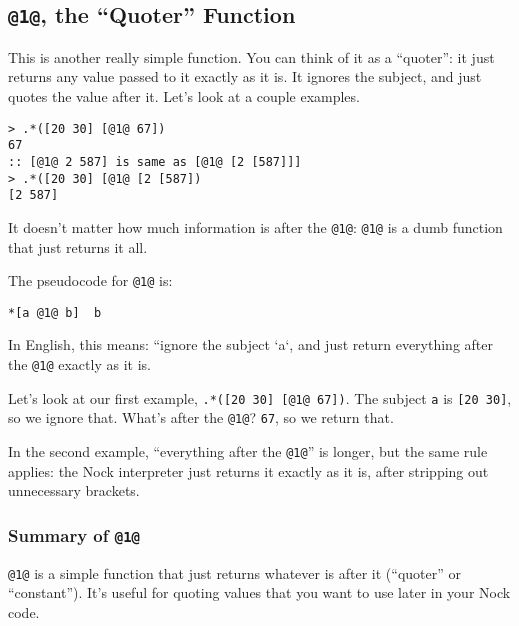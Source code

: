 \documentclass[twoside]{article}
\begin{document}
\subsection{\lstinline[style=inlinecode]{@1@}, the “Quoter” Function}
\label{sxn:nock1}

This is another really simple function. You can think of it as a “quoter”: it just returns any value passed to it exactly as it is. It ignores the subject, and just quotes the value after it. Let's look at a couple examples.

\begin{lstlisting}[style=listingcode]
> .*([20 30] [@1@ 67])
67
:: [@1@ 2 587] is same as [@1@ [2 [587]]]
> .*([20 30] [@1@ [2 [587])
[2 587]
\end{lstlisting}

It doesn't matter how much information is after the \lstinline[style=inlinecode]{@1@}: \lstinline[style=inlinecode]{@1@} is a dumb function that just returns it all.

The pseudocode for \lstinline[style=inlinecode]{@1@} is:

\begin{lstlisting}[style=listingcode]
*[a @1@ b]  b
\end{lstlisting}

In English, this means: ``ignore the subject `a`, and just return everything after the \lstinline[style=inlinecode]{@1@} exactly as it is.

Let's look at our first example, \lstinline[style=inlinecode]{.*([20 30] [@1@ 67])}. The subject \lstinline[style=inlinecode]{a} is \lstinline[style=inlinecode]{[20 30]}, so we ignore that. What's after the \lstinline[style=inlinecode]{@1@}? \lstinline[style=inlinecode]{67}, so we return that.

In the second example, “everything after the \lstinline[style=inlinecode]{@1@}” is longer, but the same rule applies: the Nock interpreter just returns it exactly as it is, after stripping out unnecessary brackets.

\subsubsection{Summary of \lstinline[style=inlinecode]{@1@}}

\lstinline[style=inlinecode]{@1@} is a simple function that just returns whatever is after it (“quoter” or “constant”). It's useful for quoting values that you want to use later in your Nock code.
\end{document}
